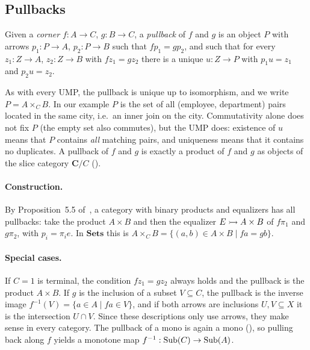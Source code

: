 \subsection{Pullbacks}
\label{sec:pullbacks}

\begin{definition}[Pullback]
  Given a \emph{corner} $f: A \to C$, $g: B \to C$, a
  \emph{pullback} of $f$ and $g$ is an object $P$ with arrows $p_1: P
  \to A$, $p_2: P \to B$ such that $f p_1 = g p_2$, and such that for
  every $z_1: Z \to A$, $z_2: Z \to B$ with $f z_1 = g z_2$ there
  is a unique $u: Z \to P$ with $p_1 u = z_1$ and $p_2 u = z_2$.
\end{definition}

\begin{center}
\end{center}

As with every UMP, the pullback is unique up to isomorphism, and we write $P =
A \times_C B$. In our example $P$ is the set of all (employee, department)
pairs located in the same city, i.e.\ an inner join on the city. Commutativity
alone does not fix $P$ (the empty set also commutes), but the UMP does:
existence of $u$ means that $P$ contains \emph{all} matching pairs, and
uniqueness means that it contains no duplicates. A pullback of $f$ and $g$ is
exactly a product of $f$ and $g$ as objects of the slice category
$\mathbf{C}/C$ ().

\paragraph{Construction.} By Proposition~5.5 of~\cite{Awodey10}, a category
with binary products and equalizers has all pullbacks: take the product $A
\times B$ and then the equalizer $E \rightarrowtail A \times B$ of $f \pi_1$ and $g
\pi_2$, with $p_i = \pi_i e$. In $\mathbf{Sets}$ this is $A \times_C B =
\{(a, b) \in A \times B \mid f a = g b\}$.

\paragraph{Special cases.} If $C = 1$ is terminal, the condition $f z_1 = g
z_2$ always holds and the pullback is the product $A \times B$. If $g$ is the
inclusion of a subset $V \subseteq C$, the pullback is the inverse image
$f^{-1}(V) = \{a \in A \mid f a \in V\}$, and if both arrows are inclusions $U,
V \subseteq X$ it is the intersection $U \cap V$. Since these descriptions only
use arrows, they make sense in every category. The pullback of a mono is again
a mono (), so pulling back along $f$ yields a monotone map
$f^{-1}: \operatorname{Sub}(C) \to \operatorname{Sub}(A)$.

